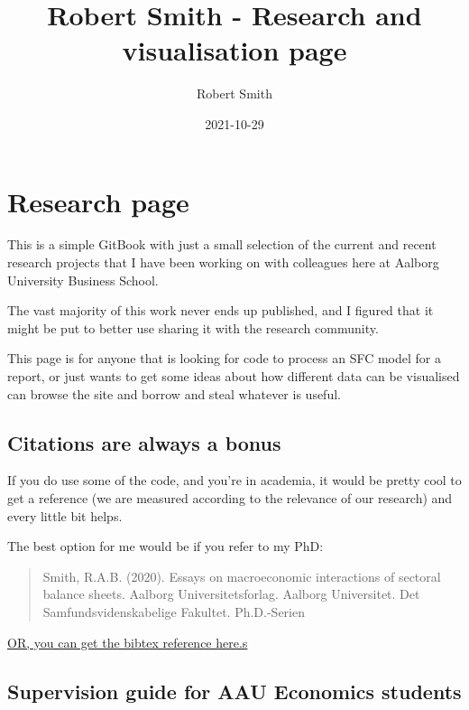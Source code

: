 \documentclass[
]{book}
\title{Robert Smith - Research and visualisation page}
\author{Robert Smith}
\date{2021-10-29}
\begin{document}
\maketitle

{
\setcounter{tocdepth}{1}
\tableofcontents
}
\hypertarget{research-page}{%
\chapter{Research page}\label{research-page}}

This is a simple GitBook with just a small selection of the current and recent research projects that I have been working on with colleagues here at Aalborg University Business School.

The vast majority of this work never ends up published, and I figured that it might be put to better use sharing it with the research community.

This page is for anyone that is looking for code to process an SFC model for a report, or just wants to get some ideas about how different data can be visualised can browse the site and borrow and steal whatever is useful.

\hypertarget{citations-are-always-a-bonus}{%
\section{Citations are always a bonus}\label{citations-are-always-a-bonus}}

If you do use some of the code, and you're in academia, it would be pretty cool to get a reference (we are measured according to the relevance of our research) and every little bit helps.

The best option for me would be if you refer to my PhD:

\begin{quote}
Smith, R.A.B. (2020). Essays on macroeconomic interactions of sectoral balance sheets. Aalborg Universitetsforlag. Aalborg Universitet. Det Samfundsvidenskabelige Fakultet. Ph.D.-Serien
\end{quote}

\href{https://vbn.aau.dk/en/publications/essays-on-macroeconomic-interactions-of-sectoral-balance-sheets}{OR, you can get the bibtex reference here.s}

\hypertarget{supervision-guide-for-aau-economics-students}{%
\section{Supervision guide for AAU Economics students}\label{supervision-guide-for-aau-economics-students}}
\end{document}
